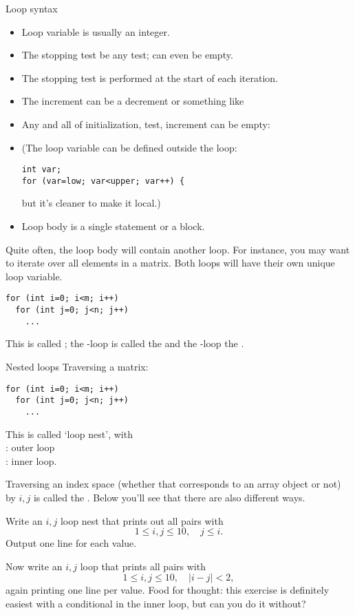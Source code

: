 \begin{slide}{Loop syntax}
  \label{sl:for-syntax}
  \begin{itemize}
  \item Loop variable is usually an integer.
  \item The stopping test be any test; can even be empty.
  \item The stopping test is performed at the start of each iteration.
  \item The increment can be a decrement or something like 
  \item Any and all of initialization, test, increment can be empty:\\
  \item (The loop variable can be defined outside the loop:
\begin{verbatim}
int var;
for (var=low; var<upper; var++) {
\end{verbatim}
but it's cleaner to make it local.)
\item Loop body is a single statement or a block.
  \end{itemize}
\end{slide}

Quite often, the loop body will contain another loop. For instance,
you may want to iterate over all elements in a matrix. Both loops will
have their own unique loop variable.
\begin{verbatim}
for (int i=0; i<m; i++)
  for (int j=0; j<n; j++)
    ...
\end{verbatim}
This is called ; 
the -loop is called the  and the
-loop the .

\begin{slide}{Nested loops}
  \label{sl:for-nest}
  Traversing a matrix:
\begin{verbatim}
for (int i=0; i<m; i++)
  for (int j=0; j<n; j++)
    ...
\end{verbatim}
This is called `loop nest', with\\
: outer loop\\
: inner loop.
\end{slide}

Traversing an index space (whether that corresponds to an array object
or not) by $i,j$ is called the .
Below you'll see that there are also different
ways.

\begin{exercise}
  \label{ex:ij-triangle}
  Write an $i,j$ loop nest that prints out all pairs with
  \[ 1\leq i,j\leq 10,\quad  j\leq i. \]
  Output one line for each  value.

  Now write an $i,j$ loop that prints all pairs with
  \[ 1\leq i,j\leq 10,\quad |i-j|<2, \]
  again printing one line per  value.
  Food for thought: this exercise is definitely easiest with a
  conditional in the inner loop, but can you do
  it without? 
\end{exercise}

